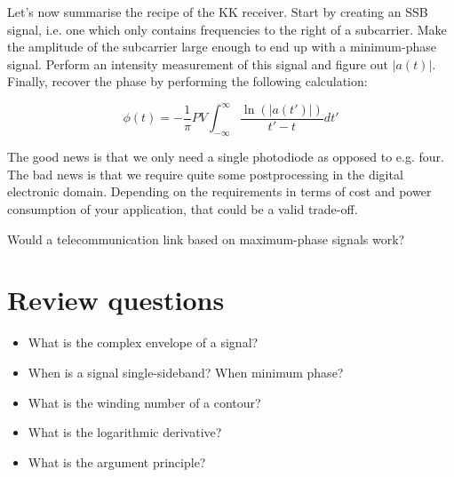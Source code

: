 Let's now summarise the recipe of the KK receiver. Start by creating an SSB signal, i.e. one which only contains frequencies to the right of a subcarrier.  Make the amplitude of the subcarrier large enough to end up with a minimum-phase signal. Perform an intensity measurement of this signal and figure out $\left|a(t)\right|$. Finally, recover the phase by performing the following calculation:

\begin{equation}
\phi(t) = -\frac{1}{\pi} PV \int_{-\infty}^{\infty} \frac{\ln \left( \left|a(t')\right| \right)}{t'-t}dt'
\label{eq-kk-timedomain-log}
\end{equation} 

The good news is that we only need a single photodiode as opposed to e.g. four. The bad news is that we require quite some postprocessing in the digital electronic domain. Depending on the requirements in terms of cost and power consumption of your application, that could be a valid trade-off.

\begin{exer}
Would a telecommunication link based on maximum-phase signals work?
\end{exer} 

\section*{Review questions}

\begin{itemize}
\item What is the complex envelope of a signal?
\item When is a signal single-sideband? When minimum phase?
\item What is the winding number of a contour?
\item What is the logarithmic derivative?
\item What is the argument principle?  
\end{itemize}
